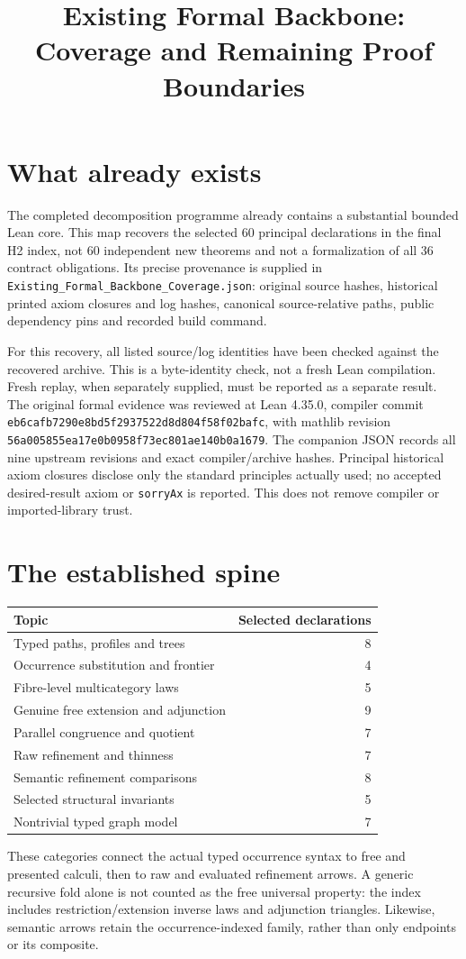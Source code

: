 \documentclass[11pt]{article}
\title{Existing Formal Backbone: Coverage and Remaining Proof Boundaries}
\begin{document}
\maketitle
\section{What already exists}
The completed decomposition programme already contains a substantial bounded Lean core. This map recovers the selected 60 principal declarations in the final H2 index, not 60 independent new theorems and not a formalization of all 36 contract obligations. Its precise provenance is supplied in \texttt{Existing\_Formal\_Backbone\_Coverage.json}: original source hashes, historical printed axiom closures and log hashes, canonical source-relative paths, public dependency pins and recorded build command.

For this recovery, all listed source/log identities have been checked against the recovered archive. This is a byte-identity check, not a fresh Lean compilation. Fresh replay, when separately supplied, must be reported as a separate result. The original formal evidence was reviewed at Lean 4.35.0, compiler commit \texttt{eb6cafb7290e8bd5f2937522d8d804f58f02bafc}, with mathlib revision \texttt{56a005855ea17e0b0958f73ec801ae140b0a1679}. The companion JSON records all nine upstream revisions and exact compiler/archive hashes. Principal historical axiom closures disclose only the standard principles actually used; no accepted desired-result axiom or \texttt{sorryAx} is reported. This does not remove compiler or imported-library trust.

\section{The established spine}
\begin{longtable}{p{.65\linewidth}r}\toprule Topic&Selected declarations\\\midrule
Typed paths, profiles and trees&8\\
Occurrence substitution and frontier&4\\
Fibre-level multicategory laws&5\\
Genuine free extension and adjunction&9\\
Parallel congruence and quotient&7\\
Raw refinement and thinness&7\\
Semantic refinement comparisons&8\\
Selected structural invariants&5\\
Nontrivial typed graph model&7\\
\bottomrule\end{longtable}
These categories connect the actual typed occurrence syntax to free and presented calculi, then to raw and evaluated refinement arrows. A generic recursive fold alone is not counted as the free universal property: the index includes restriction/extension inverse laws and adjunction triangles. Likewise, semantic arrows retain the occurrence-indexed family, rather than only endpoints or its composite.
\end{document}

